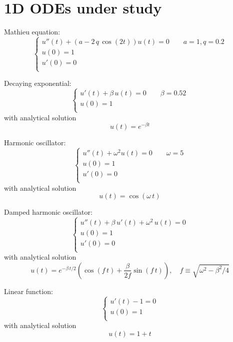\documentclass{article}
\begin{document}
\section{1D ODEs under study}
\label{app:1D}
\begin{enumerate}[label={[\arabic*]}]

\item{Mathieu equation:
\[\left\{ \begin{array}{llllllll}
u''(t)+(a-2\,q\, \cos(2 t))u(t)=0 \qquad a=1, q=0.2 \\
u(0)=1\\
u'(0)=0\\
\end{array}
\right.\] \label{eq:Mathieu}}

\item{Decaying exponential:
\[\left\{ \begin{array}{llllllll}
u'(t)+ \beta\, u(t)=0 \qquad \beta=0.52 \\
u(0)=1\\
\end{array}
\right.\]
with analytical solution
\[u(t)= e^{-\beta t}\]\label{eq:Exponential}}

\item{Harmonic oscillator:
\[\left\{ \begin{array}{llllllll}
u''(t)+ \omega^2 u(t)=0 \qquad \omega=5 \\
u(0)=1\\
u'(0)=0\\
\end{array}
\right.\]
with analytical solution
\[u(t) = \cos(\omega\, t)\]\label{eq:HO}}

\item{Damped harmonic oscillator:
\[\left\{ \begin{array}{llllllll}
u''(t)+\beta\, u'(t)+ \omega^2\, u(t)=0\\
u(0)=1\\
u'(0)=0\\
\end{array}
\right.\]
with analytical solution
\[u(t) =e^{-\beta\, t/2}\left( \cos(f\, t)+\frac{\beta}{2f}\sin(f\, t)\right), \quad f\equiv \sqrt{\omega^2-\beta^2/4}\]\label{eq:DHO}}

\item{Linear function:
\[\left\{ \begin{array}{llllllll}
u'(t)-1=0\\
u(0)=1\\
\end{array}
\right.\]
with analytical solution
\[u(t)=1+t\]\label{eq:Linear}}


\end{enumerate}
\end{document}
